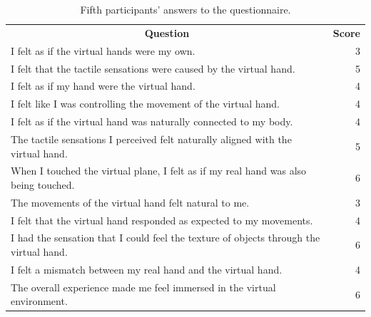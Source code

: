 \documentclass[uplatex,
12pt, %
a4paper,
english, %
oneside,
titlepage,
singlespacing, %
liststotoc, %
headsepline,
]{MastersDoctoralThesis} %
\begin{document}
\begin{appendices}
\begin{table}[H]
  \centering
  \caption{Fifth participants' answers to the questionnaire.}
    \begin{tabular}{|lrrrrrrrr|r|}
    \toprule
    \multicolumn{9}{c|}{\multirow{2}[2]{*}{\textbf{Question}}}            & \multicolumn{1}{c|}{\multirow{2}[2]{*}{\textbf{Score}}} \\
    \multicolumn{9}{c|}{}                                                 &  \\
    \midrule
    \multicolumn{9}{|l|}{I felt as if the virtual hands were my own.}     & 3 \\
    \midrule
    \multicolumn{9}{|l|}{I felt that the tactile sensations were caused by the virtual hand.} & 5 \\
    \midrule
    \multicolumn{9}{|l|}{I felt as if my hand were the virtual hand.}     & 4 \\
    \midrule
    \multicolumn{9}{|l|}{I felt like I was controlling the movement of the virtual hand.} & 4 \\
    \midrule
    \multicolumn{9}{|l|}{I felt as if the virtual hand was naturally connected to my body.} & 4 \\
    \midrule
    \multicolumn{9}{|l|}{The tactile sensations I perceived felt naturally aligned with the virtual hand.} & 5 \\
    \midrule
    \multicolumn{9}{|l|}{When I touched the virtual plane, I felt as if my real hand was also being touched.} & 6 \\
    \midrule
    \multicolumn{9}{|l|}{The movements of the virtual hand felt natural to me.} & 3 \\
    \midrule
    \multicolumn{9}{|l|}{I felt that the virtual hand responded as expected to my movements.} & 4 \\
    \midrule
    \multicolumn{9}{|l|}{I had the sensation that I could feel the texture of objects through the virtual hand.} & 6 \\
    \midrule
    \multicolumn{9}{|l|}{I felt a mismatch between my real hand and the virtual hand. } & 4 \\
    \midrule
    \multicolumn{9}{|l|}{The overall experience made me feel immersed in the virtual environment.} & 6 \\
    \bottomrule
    \end{tabular}%
  \label{tab:Q_5}%
\end{table}%


\end{appendices}
\end{document}
